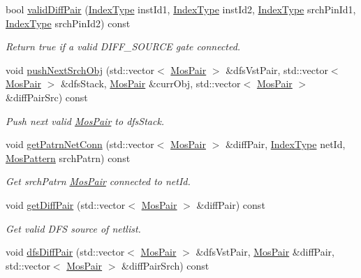 \begin{DoxyCompactItemize}
bool \hyperlink{classSymDetect_a1153c5f98df1f6dde97ed3335367bb66}{valid\+Diff\+Pair} (\hyperlink{type_8h_a581e8093e28e7362f2b6937296190676}{Index\+Type} inst\+Id1, \hyperlink{type_8h_a581e8093e28e7362f2b6937296190676}{Index\+Type} inst\+Id2, \hyperlink{type_8h_a581e8093e28e7362f2b6937296190676}{Index\+Type} srch\+Pin\+Id1, \hyperlink{type_8h_a581e8093e28e7362f2b6937296190676}{Index\+Type} srch\+Pin\+Id2) const
\begin{DoxyCompactList}\small\item\em Return true if a valid D\+I\+F\+F\+\_\+\+S\+O\+U\+R\+CE gate connected. \end{DoxyCompactList}\item 
void \hyperlink{classSymDetect_a7f4cd1010a21da88d35abb89c6f33f00}{push\+Next\+Srch\+Obj} (std\+::vector$<$ \hyperlink{classMosPair}{Mos\+Pair} $>$ \&dfs\+Vst\+Pair, std\+::vector$<$ \hyperlink{classMosPair}{Mos\+Pair} $>$ \&dfs\+Stack, \hyperlink{classMosPair}{Mos\+Pair} \&curr\+Obj, std\+::vector$<$ \hyperlink{classMosPair}{Mos\+Pair} $>$ \&diff\+Pair\+Src) const
\begin{DoxyCompactList}\small\item\em Push next valid \hyperlink{classMosPair}{Mos\+Pair} to dfs\+Stack. \end{DoxyCompactList}\item 
void \hyperlink{classSymDetect_af7d1b22086aa98a27b1eafc9266596d8}{get\+Patrn\+Net\+Conn} (std\+::vector$<$ \hyperlink{classMosPair}{Mos\+Pair} $>$ \&diff\+Pair, \hyperlink{type_8h_a581e8093e28e7362f2b6937296190676}{Index\+Type} net\+Id, \hyperlink{type_8h_af19eddb079bfea723256710b029c38e8}{Mos\+Pattern} srch\+Patrn) const
\begin{DoxyCompactList}\small\item\em Get srch\+Patrn \hyperlink{classMosPair}{Mos\+Pair} connected to net\+Id. \end{DoxyCompactList}\item 
void \hyperlink{classSymDetect_af04b93dac7e090cef8e741d8d1812485}{get\+Diff\+Pair} (std\+::vector$<$ \hyperlink{classMosPair}{Mos\+Pair} $>$ \&diff\+Pair) const
\begin{DoxyCompactList}\small\item\em Get valid D\+FS source of netlist. \end{DoxyCompactList}\item 
void \hyperlink{classSymDetect_acd33a2c834493240fc4e8840819d676c}{dfs\+Diff\+Pair} (std\+::vector$<$ \hyperlink{classMosPair}{Mos\+Pair} $>$ \&dfs\+Vst\+Pair, \hyperlink{classMosPair}{Mos\+Pair} \&diff\+Pair, std\+::vector$<$ \hyperlink{classMosPair}{Mos\+Pair} $>$ \&diff\+Pair\+Srch) const

\end{DoxyCompactItemize}
